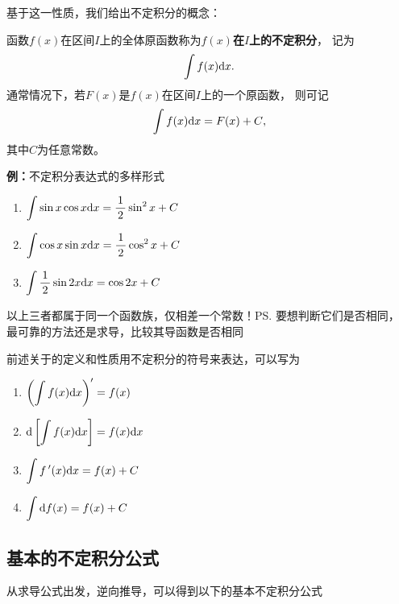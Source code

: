 基于这一性质，我们给出不定积分的概念：

\begin{thx}
	函数$f(x)$在区间$I$上的全体原函数称为{\bf $f(x)$在$I$上的不定积分}，
	记为
	$$\int f(x)\mathrm{d} x.$$
	通常情况下，若$F(x)$是$f(x)$在区间$I$上的一个原函数， 则可记
	$${\int f(x)\mathrm{d} x=F(x)+C},$$
	其中$C$为任意常数。
\end{thx}

{\bf 例：}不定积分表达式的多样形式
\begin{enumerate}[(1)]
  \setlength{\itemindent}{1cm}
  \item $\displaystyle\int\sin x\cos x\mathrm{d} x=\displaystyle\frac{\,{1}\,}{\,{2}\,}\sin^2x+C$
  \item $\displaystyle\int\cos x\sin x\mathrm{d} x=\displaystyle\frac{\,{1}\,}{\,{2}\,}\cos^2x+C$
  \item $\displaystyle\int\displaystyle\frac{\,{1}\,}{\,{2}\,}\sin2x\mathrm{d} x=\cos2x+C$
\end{enumerate}
以上三者都属于同一个函数族，仅相差一个常数！\ps{要想判断它们是否相同，
最可靠的方法还是求导，比较其导函数是否相同}

前述关于的定义和性质用不定积分的符号来表达，可以写为

\begin{thx}
	\begin{enumerate}[(1)]
	  \item $\left(\displaystyle\int f(x)\mathrm{d} x\right)'=f(x)$ 
	  \item $\mathrm{d}\left[\displaystyle\int f(x)\mathrm{d} x\right]=f(x)\mathrm{d} x$ 
	  \item $\displaystyle\int f\,'(x)\mathrm{d} x =f(x)+C$
	  \item $\displaystyle\int \mathrm{d} f(x)=f(x)+C$
	\end{enumerate}
\end{thx}

\subsection{基本的不定积分公式}

从求导公式出发，逆向推导，可以得到以下的基本不定积分公式

